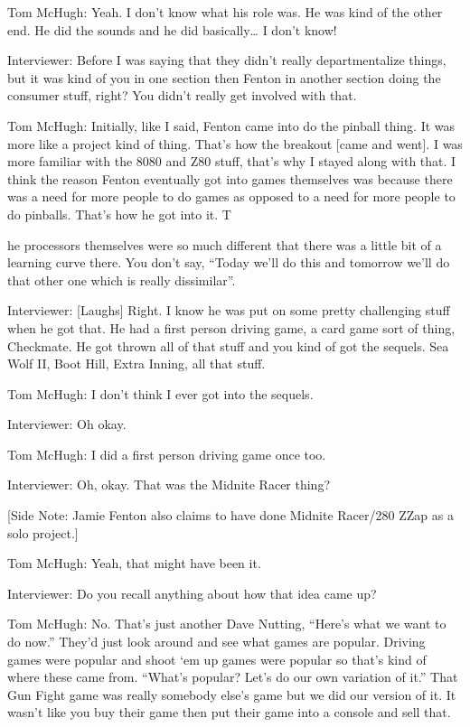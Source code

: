 \textcolor{interviewee}{Tom McHugh:} Yeah. I don’t know what his role was. He was kind of the other end. He did the sounds and he did basically… I don’t know!

\textcolor{interviewer}{Interviewer:} Before I was saying that they didn’t really departmentalize things, but it was kind of you in one section then Fenton in another section doing the consumer stuff, right? You didn’t really get involved with that.

\textcolor{interviewee}{Tom McHugh:} Initially, like I said, Fenton came into do the pinball thing. It was more like a project kind of thing. That’s how the breakout [came and went]. I was more familiar with the 8080 and Z80 stuff, that’s why I stayed along with that. I think the reason Fenton eventually got into games themselves was because there was a need for more people to do games as opposed to a need for more people to do pinballs. That’s how he got into it. T

he processors themselves were so much different that there was a little bit of a learning curve there. You don’t say, “Today we’ll do this and tomorrow we’ll do that other one which is really dissimilar”.

\textcolor{interviewer}{Interviewer:} [Laughs] Right. I know he was put on some pretty challenging stuff when he got that. He had a first person driving game, a card game sort of thing, Checkmate. He got thrown all of that stuff and you kind of got the sequels. Sea Wolf II, Boot Hill, Extra Inning, all that stuff.

\textcolor{interviewee}{Tom McHugh:} I don’t think I ever got into the sequels.

\textcolor{interviewer}{Interviewer:} Oh okay.

\textcolor{interviewee}{Tom McHugh:} I did a first person driving game once too.

\textcolor{interviewer}{Interviewer:} Oh, okay. That was the Midnite Racer thing?

[Side Note: Jamie Fenton also claims to have done Midnite Racer/280 ZZap as a solo project.]

\textcolor{interviewee}{Tom McHugh:} Yeah, that might have been it.

\textcolor{interviewer}{Interviewer:} Do you recall anything about how that idea came up?

\textcolor{interviewee}{Tom McHugh:} No. That’s just another Dave Nutting, “Here’s what we want to do now.” They’d just look around and see what games are popular. Driving games were popular and shoot ‘em up games were popular so that’s kind of where these came from. “What’s popular? Let’s do our own variation of it.” That Gun Fight game was really somebody else’s game but we did our version of it. It wasn’t like you buy their game then put their game into a console and sell that.

